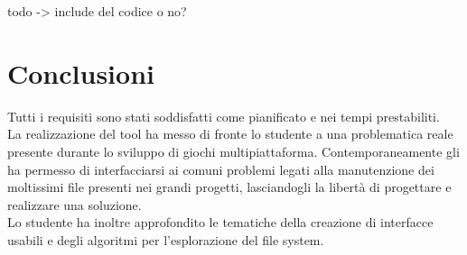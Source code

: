 todo -> include del codice o no?

\section{Conclusioni}
Tutti i requisiti sono stati soddisfatti come pianificato e nei tempi prestabiliti.\\
La realizzazione del tool ha messo di fronte lo studente a una problematica reale presente durante lo sviluppo di giochi multipiattaforma. Contemporaneamente gli ha permesso di interfacciarsi ai comuni problemi legati alla manutenzione dei moltissimi file presenti nei grandi progetti, lasciandogli la libertà di progettare e realizzare una soluzione.\\
Lo studente ha inoltre approfondito le tematiche della creazione di interfacce usabili e degli algoritmi per l'esplorazione del file system.